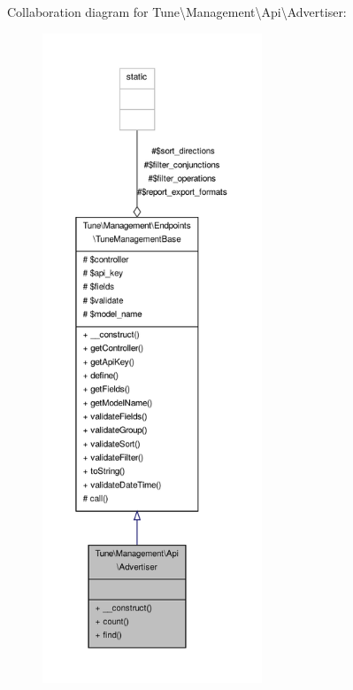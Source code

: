 Collaboration diagram for Tune\textbackslash{}Management\textbackslash{}Api\textbackslash{}Advertiser\-:
\nopagebreak
\begin{figure}[H]
\begin{center}
\leavevmode
\includegraphics[height=550pt]{classTune_1_1Management_1_1Api_1_1Advertiser__coll__graph}
\end{center}
\end{figure}
